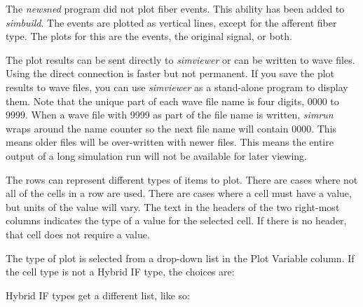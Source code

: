 \documentclass[12pt,openany,oneside]{book}
\newcommand{\prog}[1]{\textit{{#1}}}
\begin{document}
The \prog{newsned} program did not plot fiber events. This ability
has been added to \prog{simbuild}. The events are plotted as vertical 
lines, except for the afferent fiber type. The plots for this are
the events, the original signal, or both.

The plot results can be sent directly to \prog{simviewer} or can be
written to wave files. Using the direct connection is faster but not
permanent. If you save the plot results to wave files, you can use
\prog{simviewer} as a stand-alone program to display them. Note that 
the unique part of each wave file name is four digits, 0000 to 9999. When
a wave file with 9999 as part of the file name is written, \prog{simrun}
wraps around the name counter so the next file name will contain 0000.
This means older files will be over-written with newer files. This means
the entire output of a long simulation run will not be available for later
viewing.

The rows can represent different types of items to plot. There are cases
where not all of the cells in a row are used. There are cases where a cell
must have a value, but units of the value will vary.  The text in the
headers of the two right-most columns indicates the type of a value for
the selected cell. If there is no header, that cell does not require a
value.

\begin{samepage}
The type of plot is selected from a drop-down list in the Plot Variable
column. If the cell type is not a Hybrid IF type, the choices are:
\bigskip


\bigskip
Hybrid IF types get a different list, like so:

\end{samepage}
\bigskip
\end{document}
